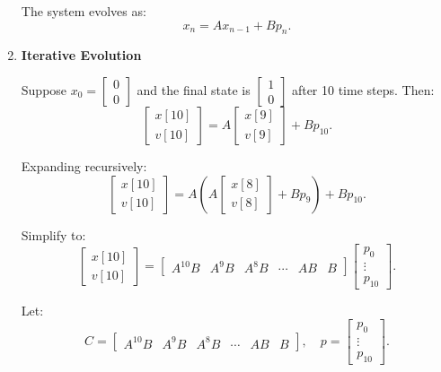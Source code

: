 \begin{example}
\begin{enumerate}
        The system evolves as:
        \[
        x_n = A x_{n-1} + B p_n.
        \]
        
        \item \textbf{Iterative Evolution}
        
        Suppose \(x_0 = \begin{bmatrix} 0 \\ 0 \end{bmatrix}\) and the final state is \(\begin{bmatrix} 1\\ 0 \end{bmatrix}\) after 10 time steps. Then:
        \[
        \begin{bmatrix}
        x[10] \\ 
        v[10]
        \end{bmatrix}
        =
        A \begin{bmatrix}
        x[9] \\ 
        v[9]
        \end{bmatrix}
        + B p_{10}.
        \]
        
        Expanding recursively:
        \[
        \begin{bmatrix}
        x[10] \\ 
        v[10]
        \end{bmatrix}
        =
        A \left(A \begin{bmatrix}
        x[8] \\ 
        v[8]
        \end{bmatrix}
        + B p_9 \right) + B p_{10}.
        \]
        
        Simplify to:
        \[
        \begin{bmatrix}
        x[10] \\ 
        v[10]
        \end{bmatrix}
        =
        \begin{bmatrix}
        A^{10} B & A^9 B & A^8 B & \cdots & AB & B
        \end{bmatrix}
        \begin{bmatrix}
        p_0 \\ 
        \vdots \\ 
        p_{10}
        \end{bmatrix}.
        \]
        
        Let:
        \[
        C = \begin{bmatrix}
        A^{10} B & A^9 B & A^8 B & \cdots & AB & B
        \end{bmatrix}, \quad 
        p = \begin{bmatrix}
        p_0 \\ 
        \vdots \\ 
        p_{10}
        \end{bmatrix}.
        \]
        

\end{enumerate}
\end{example}
